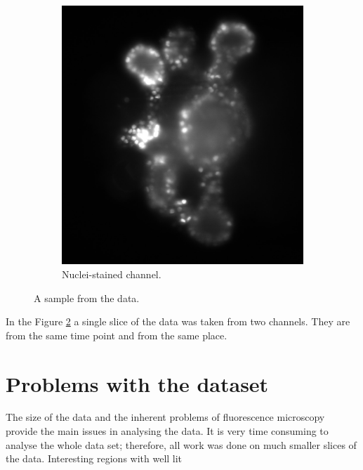\documentclass[
  digital,     %
  oneside,     %
  nosansbold,  %
  nocolorbold, %
  lof,         %
  lot,         %
]{fithesis4}
\begin{document}
\begin{figure}
\begin{subfigure}[t]{0.4\textwidth}
        \includegraphics[width=\textwidth]{resources/C2-t006-200-scaled.jpg}
        \caption{Nuclei-stained channel.}
        \label{fig:data_example_nuclei}
    \end{subfigure}
    \caption{A sample from the data.}
    \label{fig:data_example}
\end{figure}
In the Figure \ref{fig:data_example} a single slice of the data was taken from
two channels. They are from the same time point and from the same place.

\section{Problems with the dataset}

The size of the data and the inherent problems of fluorescence microscopy
provide the main issues in analysing the data. It is very time consuming to
analyse the whole data set; therefore, all work was done on much smaller slices
of the data. Interesting regions with well lit
\end{document}
